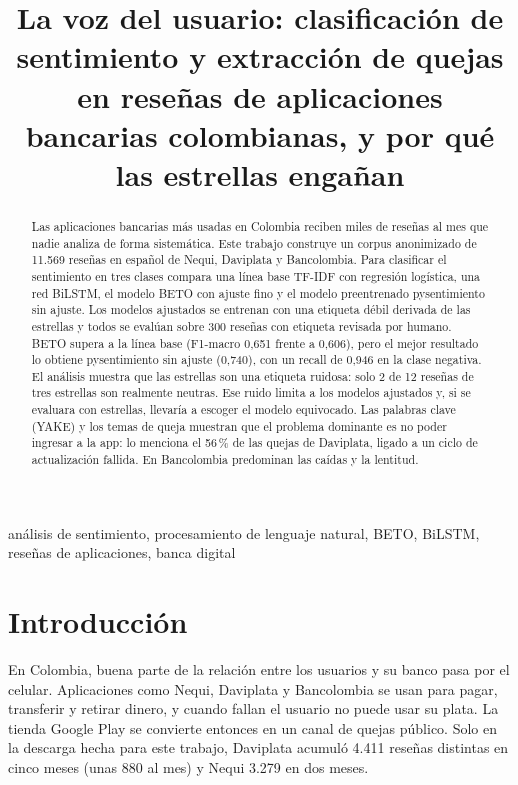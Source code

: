 \documentclass[conference]{IEEEtran}
\begin{document}
\title{La voz del usuario: clasificación de sentimiento y extracción de quejas en reseñas de aplicaciones bancarias colombianas, y por qué las estrellas engañan}

\author{
}

\maketitle

\begin{abstract}
Las aplicaciones bancarias más usadas en Colombia reciben miles de reseñas al mes que nadie analiza de forma
sistemática. Este trabajo construye un corpus anonimizado de 11.569 reseñas en español de Nequi, Daviplata y
Bancolombia. Para clasificar el sentimiento en tres clases compara una línea base TF-IDF con regresión logística,
una red BiLSTM, el modelo BETO con ajuste fino y el modelo preentrenado pysentimiento sin ajuste. Los modelos
ajustados se entrenan con una etiqueta débil derivada de las estrellas y todos se evalúan sobre 300 reseñas con
etiqueta revisada por humano. BETO supera a la línea base (F1-macro 0,651 frente a 0,606), pero el mejor resultado
lo obtiene pysentimiento sin ajuste (0,740), con un recall de 0,946 en la clase negativa. El análisis muestra que
las estrellas son una etiqueta ruidosa: solo 2 de 12 reseñas de tres estrellas son realmente neutras. Ese ruido
limita a los modelos ajustados y, si se evaluara con estrellas, llevaría a escoger el modelo equivocado.
Las palabras clave (YAKE) y los temas de queja muestran que el problema dominante es no poder ingresar a la app:
lo menciona el 56\,\% de las quejas de Daviplata, ligado a un ciclo de actualización fallida. En Bancolombia
predominan las caídas y la lentitud.
\end{abstract}

\begin{IEEEkeywords}
análisis de sentimiento, procesamiento de lenguaje natural, BETO, BiLSTM, reseñas de aplicaciones, banca digital
\end{IEEEkeywords}

\section{Introducción}
En Colombia, buena parte de la relación entre los usuarios y su banco pasa por el celular. Aplicaciones como Nequi,
Daviplata y Bancolombia se usan para pagar, transferir y retirar dinero, y cuando fallan el usuario no puede usar su
plata. La tienda Google Play se convierte entonces en un canal de quejas público. Solo en la descarga hecha para este
trabajo, Daviplata acumuló 4.411 reseñas distintas en cinco meses (unas 880 al mes) y Nequi 3.279 en dos meses.
\end{document}
